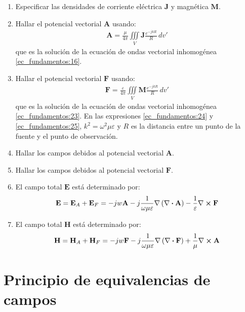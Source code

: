 \begin{enumerate}
\item Especificar las densidades de corriente eléctrica $\mathbf{J}$ y magnética $\mathbf{M}$.
\item Hallar el potencial vectorial $\mathbf{A}$ usando:
\begin{align}
\mathbf{A} = \frac{\mu}{4\pi}\iiint\limits_V\mathbf{J}\frac{e^{-jkR}}{R}\,dv'
\label{ec_fundamentos:24}
\end{align}
que es la solución de la ecuación de ondas vectorial inhomogénea \eqref{ec_fundamentos:16}.
\item Hallar el potencial vectorial $\mathbf{F}$ usando:
\begin{align}
\mathbf{F} = \frac{\varepsilon}{4\pi}\iiint\limits_V\mathbf{M}\frac{e^{-jkR}}{R}\,dv'
\label{ec_fundamentos:25}
\end{align}
que es la solución de la ecuación de ondas vectorial inhomogénea \eqref{ec_fundamentos:23}. En las expresiones \eqref{ec_fundamentos:24} y \eqref{ec_fundamentos:25}, $k^2 = \omega^2\mu\varepsilon$ y $R$ es la distancia entre un punto de la fuente y el punto de observación.
\item Hallar los campos debidos al potencial vectorial $\mathbf{A}$.
\item Hallar los campos debidos al potencial vectorial $\mathbf{F}$.
\item El campo total $\mathbf{E}$ está determinado por:
\begin{align}
\mathbf{E} = \mathbf{E}_A + \mathbf{E}_F = - jw\mathbf{A} - j\frac{1}{\omega\mu\varepsilon}\nabla\left(\nabla\boldsymbol{\cdot}\mathbf{A}\right) - \frac{1}{\varepsilon}\nabla\boldsymbol{\times}\mathbf{F}
\label{ec_fundamentos:26}
\end{align}
\item El campo total $\mathbf{H}$ está determinado por:
\begin{align}
\mathbf{H} = \mathbf{H}_A + \mathbf{H}_F = - jw\mathbf{F} - j\frac{1}{\omega\mu\varepsilon}\nabla\left(\nabla\boldsymbol{\cdot}\mathbf{F}\right) + \frac{1}{\mu}\nabla\boldsymbol{\times}\mathbf{A}
\label{ec_fundamentos:27}
\end{align}
\end{enumerate}

\section{Principio de equivalencias de campos}
\label{sec_fundamentos_principio}

